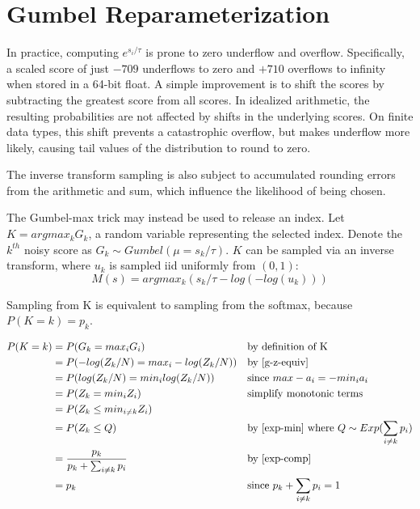 \documentclass{article}
\begin{document}
\section{Gumbel Reparameterization}
\label{gumbel-reparam}

In practice, computing $e^{s_i / \tau}$ is prone to zero underflow and overflow. 
Specifically, a scaled score of just $-709$ underflows to zero and $+710$ overflows to infinity when stored in a 64-bit float. 
A simple improvement is to shift the scores by subtracting the greatest score from all scores.
In idealized arithmetic, the resulting probabilities are not affected by shifts in the underlying scores.
On finite data types, this shift prevents a catastrophic overflow, but makes underflow more likely, 
causing tail values of the distribution to round to zero. 

The inverse transform sampling is also subject to accumulated rounding errors from the arithmetic and sum, 
which influence the likelihood of being chosen.

The Gumbel-max trick may instead be used to release an index.
Let $K = argmax_k G_k$, a random variable representing the selected index. 
Denote the $k^{th}$ noisy score as $G_k \sim Gumbel(\mu = s_k / \tau)$.
$K$ can be sampled via an inverse transform, where $u_k$ is sampled iid uniformly from $(0, 1)$:
\begin{equation}
    M(s) = argmax_k (s_k / \tau - log(-log(u_k)))
\end{equation}

\begin{theorem}
    \label{gumbel-equiv}
Sampling from K is equivalent to sampling from the softmax, because $P(K=k) = p_k$. \cite{Medina2020DuffAD}
\end{theorem}
\begin{align*}
    P(K = k) &= P(G_k = max_i G_i) &&\text{by definition of K} \\
    &= P(-log(Z_k / N) = max_i -log(Z_k / N)) &&\text{by \ref{g-z-equiv}}\\
    &= P(log(Z_k / N) = min_i log(Z_k / N)) &&\text{since } max -a_i = -min_i a_i \\
    &= P(Z_k = min_i Z_i) &&\text{simplify monotonic terms} \\
    &= P(Z_k \leq min_{i \neq k} Z_i) \\
    &= P(Z_k \leq Q) &&\text{by \ref{exp-min} where } Q \sim Exp(\sum_{i \neq k} p_i)\\
    &= \frac{p_k}{p_k + \sum_{i \neq k} p_i}  &&\text{by \ref{exp-comp}} \\
    &= p_k &&\text{since } p_k + \sum_{i \neq k} p_i = 1
\end{align*}
\end{document}
